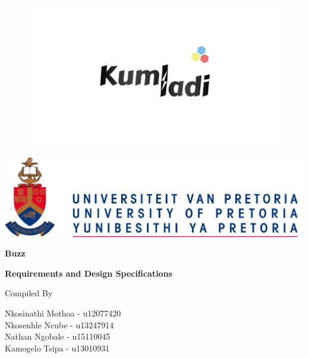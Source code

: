 \documentclass[12pt]{article}
\begin{document}
\begin{titlepage}
\begin{figure}[h!]\includegraphics[width=\linewidth]{Diagrams/kumladi.PNG}
\end{figure}

\begin{center}
\includegraphics[scale=1]{Diagrams/up.jpg}
\begin{huge}
	
\bigskip
\bigskip
\bigskip
\textbf{Buzz}
\bigskip
\bigskip
\bigskip
\end{huge}

 \begin{huge}
 \textbf{Requirements and Design Specifications}
\end{huge}
\newpage
\pagebreak


Compiled By \\[\baselineskip]
{\large

Nkosinathi Mothoa - u12077420\\
Nkosenhle Ncube - u13247914\\
Nathan Ngobale - u15110045\\
Kamogelo Tsipa - u13010931\\
\par}

\end{center}

\end{titlepage}
\end{document}
